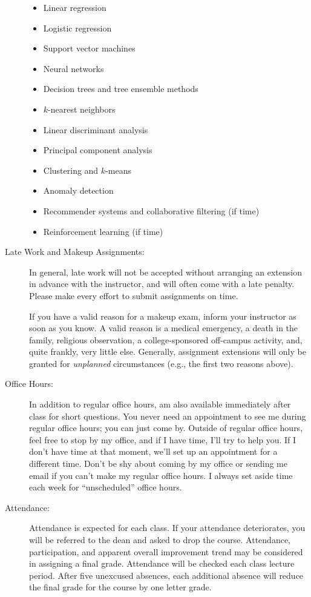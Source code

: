 \documentclass [letterpaper,11pt]{article}
\begin{document}
\begin{description}
\begin{itemize} 
	\item Linear regression
	\item Logistic regression
	\item Support vector machines
	\item Neural networks
	\item Decision trees and tree ensemble methods
	\item $k$-nearest neighbors
	\item Linear discriminant analysis
	\item Principal component analysis
	\item Clustering and $k$-means
	\item Anomaly detection
	\item Recommender systems and collaborative filtering (if time)
	\item Reinforcement learning (if time)
\end{itemize}

\item[Late Work and Makeup Assignments:]
In general, late work will not be accepted without arranging an extension in advance
with the instructor, and will often come with a late penalty.
Please make every effort to submit assignments on time.

If you have a valid reason for a makeup exam, inform your instructor
   as soon as you know.  A valid reason is a medical emergency, a death in the family, 
   religious observation, a college-sponsored off-campus activity, and, quite frankly, 
   very little else.  Generally, assignment extensions will only be granted for 
   \emph{unplanned} circumstances (e.g., the first two reasons above). 
   

\item[Office Hours:]
In addition to regular office hours, am also available immediately after class for
short questions. You never need an appointment to see me during regular office hours; you
can just come by. Outside of regular office hours, feel free to stop by my office, and if I have
time, I'll try to help you. If I don't have time at that moment, we'll set up an appointment
for a different time. Don't be shy about coming by my office or sending me email if you can't
make my regular office hours. I always set aside time each week for ``unscheduled'' office
hours.

\item[Attendance:]
Attendance is expected for each class. If your attendance deteriorates, you will be referred to the dean and asked to drop the course. Attendance, participation, and apparent overall improvement trend may be considered in assigning a final grade.
Attendance will be checked each class lecture period.  After five unexcused absences, each additional absence will reduce the final grade for the course by one letter grade.


\end{description}
\end{document}
